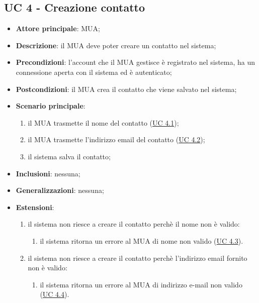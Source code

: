 \subsection{UC 4 - Creazione contatto} \label{sec:UC4}
    \begin{itemize}
        \item \textbf{Attore principale}: MUA;
        \item \textbf{Descrizione}: il MUA deve poter creare un contatto nel sistema;
        \item \textbf{Precondizioni}: l’account che il MUA gestisce è registrato nel sistema, ha un connessione aperta con il sistema ed è autenticato;
        \item \textbf{Postcondizioni}: il MUA crea il contatto che viene salvato nel sistema;
        \item \textbf{Scenario principale}:
            \begin{enumerate}
                \item il MUA trasmette il nome del contatto (\hyperref[sec:UC4.1]{UC 4.1});
                \item il MUA trasmette l'indirizzo email del contatto (\hyperref[sec:UC4.2]{UC 4.2});
                \item il sistema salva il contatto;
            \end{enumerate}
        \item \textbf{Inclusioni}: nessuna;
        \item \textbf{Generalizzazioni}: nessuna;
        \item \textbf{Estensioni}:         
        \begin{enumerate}[label=\alph*.]
            \item il sistema non riesce a creare il contatto perchè il nome non è valido:
            \begin{enumerate}[label=\arabic*.]
                \item il sistema ritorna un errore al MUA di nome non valido (\hyperref[sec:UC4.3]{UC 4.3}).
            \end{enumerate}
            \item il sistema non riesce a creare il contatto perchè l'indirizzo email fornito non è valido:
            \begin{enumerate}[label=\arabic*.]
                \item il sistema ritorna un errore al MUA di indirizzo e-mail non valido (\hyperref[sec:UC4.4]{UC 4.4}).
            \end{enumerate}
        \end{enumerate}
    \end{itemize}


